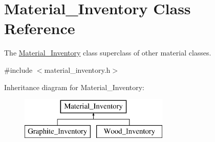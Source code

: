 \hypertarget{classMaterial__Inventory}{}\section{Material\+\_\+\+Inventory Class Reference}
\label{classMaterial__Inventory}


The \mbox{\hyperlink{classMaterial__Inventory}{Material\+\_\+\+Inventory}} class superclass of other material classes.  




{\ttfamily \#include $<$material\+\_\+inventory.\+h$>$}

Inheritance diagram for Material\+\_\+\+Inventory\+:\begin{figure}[H]
\begin{center}
\leavevmode
\includegraphics[height=2.000000cm]{classMaterial__Inventory}
\end{center}
\end{figure}
